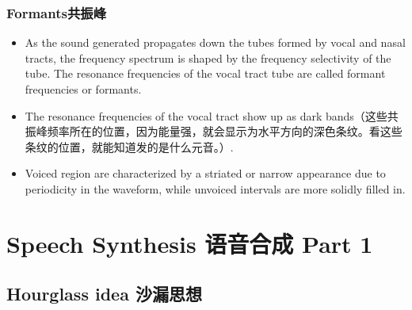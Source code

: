 \documentclass[UTF8]{ctexart}
\begin{document}
\subsubsection{Formants共振峰}
\begin{itemize}
    \item As the sound generated propagates down the tubes formed by vocal and nasal tracts, the frequency spectrum is shaped by the frequency selectivity of the tube. The resonance frequencies of the vocal tract tube are called formant frequencies or formants.
    \item The resonance frequencies of the vocal tract show up as dark bands（这些共振峰频率所在的位置，因为能量强，就会显示为水平方向的深色条纹。看这些条纹的位置，就能知道发的是什么元音。）.
    \item Voiced region are characterized by a striated or narrow appearance due to periodicity in the waveform, while unvoiced intervals are more solidly filled in.
\end{itemize}

\section{Speech Synthesis 语音合成 Part 1}

\subsection{Hourglass idea 沙漏思想}
\end{document}
